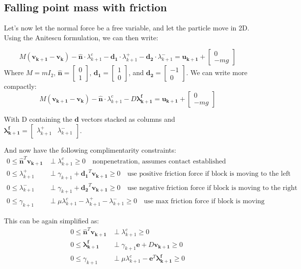 \documentclass{article}
\renewcommand{\vec}[1]{\boldsymbol{#1}}
\newcommand{\rvec}[1]{\begin{bmatrix} #1 \end{bmatrix}}
\begin{document}
\subsection{Falling point mass with friction}
Let's now let the normal force be a free variable, and let the particle move in 2D. Using the Anitescu formulation, we can then write:

\[
    M (\vec{v_{k+1}} - \vec{v_k}) - \vec{\hat n} \cdot \lambda^c _{k+1} - \vec{d_1} \cdot \lambda^+_{k+1} - \vec{d_2} \cdot \lambda^-_{k+1} = \vec{u_{k+1}} + \rvec{0 \\ -m g}
\]
Where $M = m I_2$, $\vec{\hat n} = \rvec{0 \\ 1}$, $\vec{d _1} = \rvec{1 \\ 0}$, and $\vec{d _2} = \rvec{-1 \\ 0}$. We can write more compactly:
\[
    M (\vec{v_{k+1}} - \vec{v_k}) - \vec{\hat n} \cdot \lambda^c _{k+1} - D \vec{\lambda^f_{k+1}} = \vec{u_{k+1}} + \rvec{0 \\ -m g}
\]

With D containing the $\vec{d}$ vectors stacked as columns and $\vec{\lambda^f_{k+1}} = \rvec{\lambda^+_{k+1} & \lambda^-_{k+1}}$.

And now have the following complimentarity constraints:
\begin{align*}
    0 \leq \vec{\hat n}^T \vec{v_{k+1}} & \perp \lambda^c_{k+1} \geq 0 \quad \textrm{nonpenetration, assumes contact established} \\
   0 \leq \lambda^+_{k+1} &\perp \gamma_{k+1} + \vec{d_1}^T \vec{v_{k+1}} \geq 0 \quad \textrm{use positive friction force if block is moving to the left}\\
   0 \leq \lambda^-_{k+1} &\perp \gamma_{k+1} + \vec{d_2}^T \vec{v_{k+1}} \geq 0 \quad \textrm{use negative friction force if block is moving to the right}\\
    0 \leq \gamma_{k+1} &\perp \mu \lambda^c_{k+1} - \lambda^+_{k+1} - \lambda^-_{k+1} \geq 0 \quad \textrm{use max friction force if block is moving}
\end{align*}

This can be again simplified as:
\begin{align*}
    0 \leq \vec{\hat n}^T \vec{v_{k+1}} & \perp \lambda^c_{k+1} \geq 0 \\
    0 \leq \vec{\lambda^f_{k+1}} &\perp \gamma_{k+1} \vec{e} + D \vec{v_{k+1}} \geq 0 \\
    0 \leq \gamma_{k+1} &\perp \mu \lambda^c_{k+1} - \vec{e}^T \vec{\lambda^f_{k+1}} \geq 0
\end{align*}
\end{document}
